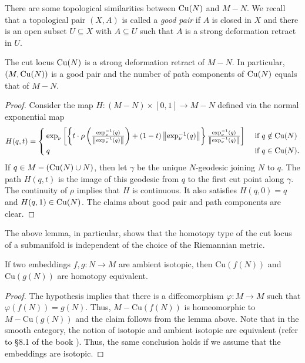 \hf There are some topological similarities between $\mathrm{Cu}(N)$ and $M-N$. We recall that a topological pair $(X, A)$ is called a \textit{good pair} if $A$ is closed in $X$ and there is an open subset $U\subseteq X$ with $A\subseteq U$ such that $A$ is a strong deformation retract in $U$.
\begin{lemma}\label{defretM-N}
The cut locus $\mathrm{Cu}(N)$ is a strong deformation retract of $M-N$. In particular, $(M,\mathrm{Cu}(N))$ is a good pair and the number of path components of $\mathrm{Cu}(N)$ equals that of $M-N$.
\end{lemma}
\begin{proof}
    Consider the map $H:(M-N)\times [0,1]\to M-N$ defined via the normal exponential map 
    \begin{align*}
        H(q,t) = \begin{cases}
            \exp_\nu\left[\left\{t \cdot \rho\left( \frac{\exp_\nu^{-1}(q) }{\left\|\exp_\nu^{-1}(q)\right\|} \right)+(1-t)\left\|\exp_\nu^{-1}(q)\right\|\right\}\frac{\exp_\nu^{-1}(q)}{\left\|\exp_\nu^{-1}(q)\right\|}\right]  & \text{ if } q\notin \mathrm{Cu}(N) \\[1ex]
            q & \text{ if } q\in \mathrm{Cu}(N).
        \end{cases}
    \end{align*}
    If $q\in M - (\mathrm{Cu}(N)\cup N)$, then let $\gamma$ be the unique $N$-geodesic joining $N$ to $q$. The path $H(q,t)$ is the image of this geodesic from $q$ to the first cut point along $\gamma$. The continuity of $\rho$ implies that $H$ is continuous. It also satisfies $H(q,0)=q$ and $H(q,1)\in\mathrm{Cu}(N)$. The claims about good pair and path components are clear.
\end{proof}

\begin{rem}
    The above lemma, in particular, shows that the homotopy type of the cut locus of a submanifold is independent of the choice of the Riemannian metric.
\end{rem}

\begin{cor}\label{htpy-cut-locus}
    If two embeddings $f,g:N\to M$ are ambient isotopic, then $\mathrm{Cu}(f(N))$ and $\mathrm{Cu}(g(N))$ are homotopy equivalent.
\end{cor}
\begin{proof}
    The hypothesis implies that there is a diffeomorphism $\varphi: M\to M$ such that $\varphi(f(N))=g(N)$. Thus, $M-\mathrm{Cu}(f(N))$ is homeomorphic to $M-\mathrm{Cu}(g(N))$ and the claim follows from the lemma above. Note that in the smooth category, the notion of isotopic and ambient isotopic are equivalent (refer to \S 8.1 of the book \cite{Hir76}). Thus, the same conclusion holds if we assume that the embeddings are isotopic.
\end{proof}

